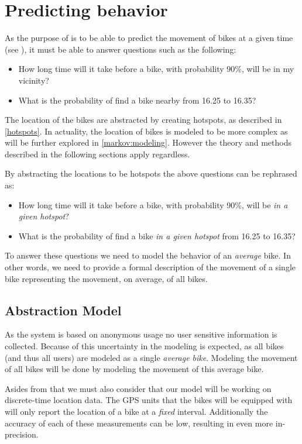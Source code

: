 \section{Predicting behavior}
As the purpose of \projectname{} is to be able to predict the movement of bikes at a given time (see ), it must be able to answer questions such as the following:
\begin{itemize}
\item How long time will it take before a bike, with probability 90\%, will be in my vicinity?
\item What is the probability of find a bike nearby from 16.25 to 16.35?
\end{itemize}

The location of the bikes are abstracted by creating hotspots, as described in \cref{hotspots}.
In actuality, the location of bikes is modeled to be more complex as will be further explored in \cref{markov:modeling}.
However the theory and methods described in the following sections apply regardless.

By abstracting the locations to be hotspots the above questions can be rephrased as:

\begin{itemize}
\item How long time will it take before a bike, with probability 90\%, will be \textit{in a given hotspot}?
\item What is the probability of find a bike \textit{in a given hotspot} from 16.25 to 16.35?
\end{itemize}

To answer these questions we need to model the behavior of an \textit{average} bike.
In other words, we need to provide a formal description of the movement of a single bike representing the movement, on average, of all bikes.

\subsection{Abstraction Model}
As the system is based on anonymous usage no user sensitive information is collected.
Because of this uncertainty in the modeling is expected, as all bikes (and thus all users) are modeled as a single \textit{average bike}.
Modeling the movement of all bikes will be done by modeling the movement of this average bike.

Asides from that we must also consider that our model will be working on discrete-time location data.
The GPS units that the bikes will be equipped with will only report the location of a bike at a \textit{fixed} interval.
Additionally the accuracy of each of these measurements can be low, resulting in even more in-precision.

